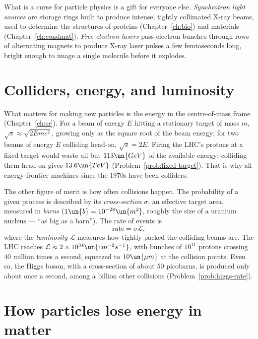 What is a curse for particle physics is a gift for everyone else. \emph{Synchrotron light sources} are storage rings built to produce intense, tightly collimated X-ray beams, used to determine the structures of proteins (Chapter~\ref{ch:bio}) and materials (Chapter~\ref{ch:condmat}). \emph{Free-electron lasers} pass electron bunches through rows of alternating magnets to produce X-ray laser pulses a few femtoseconds long, bright enough to image a single molecule before it explodes.

\section{Colliders, energy, and luminosity}

What matters for making new particles is the energy in the centre-of-mass frame (Chapter~\ref{ch:sr}). For a beam of energy $E$ hitting a stationary target of mass $m$, $\sqrt s\approx\sqrt{2Emc^2}$, growing only as the square root of the beam energy; for two beams of energy $E$ colliding head-on, $\sqrt s = 2E$. Firing the LHC's protons at a fixed target would waste all but $113\un{GeV}$ of the available energy; colliding them head-on gives $13.6\un{TeV}$ (Problem~\ref{prob:fixed-target}). That is why all energy-frontier machines since the 1970s have been colliders.

The other figure of merit is how often collisions happen. The probability of a given process is described by its \emph{cross-section} $\sigma$, an effective target area, measured in \emph{barns} ($1\un{b} = 10^{-28}\un{m^2}$, roughly the size of a uranium nucleus --- ``as big as a barn''). The rate of events is
\[
  \text{rate} = \sigma\mathcal{L},
\]
where the \emph{luminosity} $\mathcal L$ measures how tightly packed the colliding beams are. The LHC reaches $\mathcal L\approx2\times10^{34}\un{cm^{-2}s^{-1}}$, with bunches of $10^{11}$ protons crossing $40$ million times a second, squeezed to $10\un{\mu m}$ at the collision points. Even so, the Higgs boson, with a cross-section of about $50$ picobarns, is produced only about once a second, among a billion other collisions (Problem~\ref{prob:higgs-rate}).

\section{How particles lose energy in matter}

